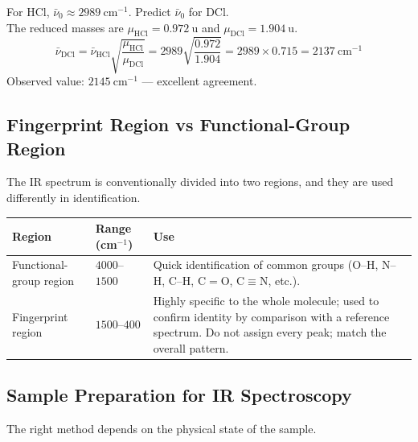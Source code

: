 \documentclass[12pt,a4paper]{article}
\begin{document}
\begin{tcolorbox}[examplebox, title={Solved Example: \texorpdfstring{$\mathrm{H{-}Cl}$}{H-Cl} vs \texorpdfstring{$\mathrm{D{-}Cl}$}{D-Cl} Vibrational Frequency}]
For HCl, $\bar{\nu}_0 \approx 2989\ \mathrm{cm^{-1}}$. Predict $\bar{\nu}_0$ for DCl.\\
The reduced masses are $\mu_{\mathrm{HCl}}=0.972\ \mathrm{u}$ and $\mu_{\mathrm{DCl}}=1.904\ \mathrm{u}$.
\[
\bar{\nu}_{\mathrm{DCl}}=\bar{\nu}_{\mathrm{HCl}}\sqrt{\frac{\mu_{\mathrm{HCl}}}{\mu_{\mathrm{DCl}}}}=2989\sqrt{\frac{0.972}{1.904}}=2989\times 0.715=2137\ \mathrm{cm^{-1}}
\]
Observed value: $2145\ \mathrm{cm^{-1}}$ — excellent agreement.
\end{tcolorbox}

\subsection{Fingerprint Region vs Functional-Group Region}
The IR spectrum is conventionally divided into two regions, and they are used differently in identification.

\begin{tabularx}{\linewidth}{|B{2.8cm}|Y|Y|}
\hline
\textbf{Region} & \textbf{Range (cm$^{-1}$)} & \textbf{Use} \\
\hline
Functional-group region & $4000$--$1500$ & Quick identification of common groups (O--H, N--H, C--H, C${=}$O, C${\equiv}$N, etc.). \\
\hline
Fingerprint region & $1500$--$400$ & Highly specific to the whole molecule; used to confirm identity by comparison with a reference spectrum. Do not assign every peak; match the overall pattern. \\
\hline
\end{tabularx}

\subsection{Sample Preparation for IR Spectroscopy}
The right method depends on the physical state of the sample.
\end{document}
